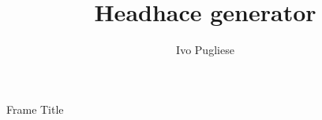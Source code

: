\documentclass{beamer}
\title{Headhace generator}
\author{Ivo Pugliese}
\begin{document}
\begin{frame}[plain]
    \maketitle
\end{frame}
\begin{frame}{Frame Title}
\end{frame}
\end{document}
